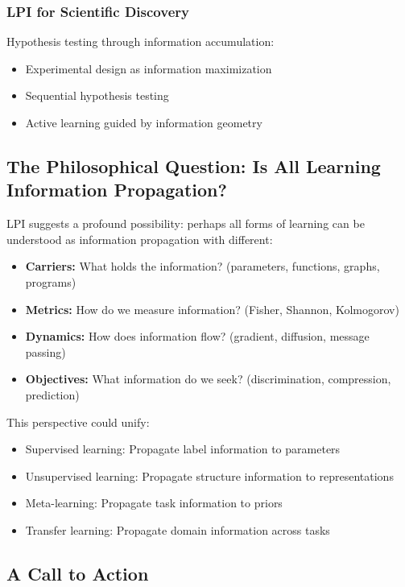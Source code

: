 \documentclass[11pt]{article}
\begin{document}
\subsubsection{LPI for Scientific Discovery}
Hypothesis testing through information accumulation:
\begin{itemize}
\item Experimental design as information maximization
\item Sequential hypothesis testing
\item Active learning guided by information geometry
\end{itemize}

\subsection{The Philosophical Question: Is All Learning Information Propagation?}

LPI suggests a profound possibility: perhaps all forms of learning can be understood as information propagation with different:
\begin{itemize}
\item \textbf{Carriers:} What holds the information? (parameters, functions, graphs, programs)
\item \textbf{Metrics:} How do we measure information? (Fisher, Shannon, Kolmogorov)
\item \textbf{Dynamics:} How does information flow? (gradient, diffusion, message passing)
\item \textbf{Objectives:} What information do we seek? (discrimination, compression, prediction)
\end{itemize}

This perspective could unify:
\begin{itemize}
\item Supervised learning: Propagate label information to parameters
\item Unsupervised learning: Propagate structure information to representations
\item Meta-learning: Propagate task information to priors
\item Transfer learning: Propagate domain information across tasks
\end{itemize}

\subsection{A Call to Action}
\end{document}
